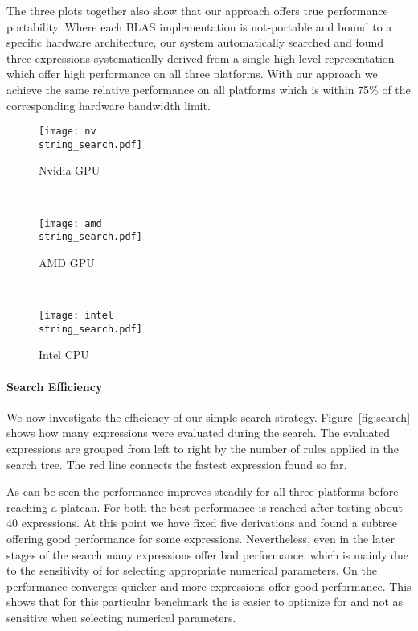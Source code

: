 The three plots together also show that our approach offers true performance portability.
Where each BLAS implementation is not-portable and bound to a specific hardware architecture, our system automatically searched and found three expressions systematically derived from a single high-level representation which offer high performance on all three platforms.
With our approach we achieve the same relative performance on all platforms which is within 75\% of the corresponding hardware bandwidth limit.

\begin{figure*}[p]
%
\centering
\begin{subfigure}[b]{0.65\linewidth}
\texttt{[image: nv\\string\_search.pdf]}
\caption{Nvidia GPU}
\label{fig:search:nv}
\end{subfigure}
\\
%
\begin{subfigure}[b]{0.65\linewidth}
\texttt{[image: amd\\string\_search.pdf]}
\caption{AMD GPU}
\label{fig:search:amd}
\end{subfigure}
\\
%
\begin{subfigure}[b]{0.65\linewidth}
\texttt{[image: intel\\string\_search.pdf]}
\caption{Intel CPU}
\label{fig:search:intel}
\end{subfigure}

\caption{
   Search efficiency.
   The vertical partitioning represents the number of fixed derivations in the search tree.
   The red line connects the fastest expressions found so far.
}
\label{fig:search}
\end{figure*}


\paragraph{Search Efficiency}
We now investigate the efficiency of our simple search strategy.
Figure~\ref{fig:search} shows how many expressions were evaluated during the search.
The evaluated expressions are grouped from left to right by the number of rules applied in the search tree.
The red line connects the fastest expression found so far.

As can be seen the performance improves steadily for all three platforms before reaching a plateau.
For both \GPUs the best performance is reached after testing about 40 expressions.
At this point we have fixed five derivations and found a subtree offering good performance for some expressions.
Nevertheless, even in the later stages of the search many expressions offer bad performance, which is mainly due to the sensitivity of \GPU for selecting appropriate numerical parameters.
On the \CPU performance converges quicker and more expressions offer good performance.
This shows that for this particular benchmark the \CPU is easier to optimize for and not as sensitive when selecting numerical parameters.

